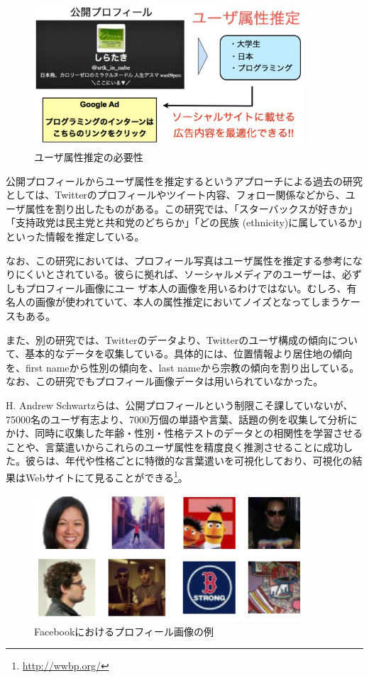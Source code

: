 \begin{figure}[tbp]
 \begin{center}
  \includegraphics[width=100mm]{img/c7/prof2prop}
 \end{center}
 \caption{ユーザ属性推定の必要性}
 \label{c7_prof2prop}
\end{figure}

公開プロフィールからユーザ属性を推定するというアプローチによる過去の研究としては、Twitterのプロフィールやツイート内容、フォロー関係などから、ユーザ属性を割り出したものがある\cite{pennacchiotti2011a-machine}。この研究では、「スターバックスが好きか」「支持政党は民主党と共和党のどちらか」「どの民族 (ethnicity)に属しているか」といった情報を推定している。\par
なお、この研究においては、プロフィール写真はユーザ属性を推定する参考になりにくいとされている。彼らに拠れば、ソーシャルメディアのユーザーは、必ずしもプロフィール画像にユー
ザ本人の画像を用いるわけではない。むしろ、有名人の画像が使われていて、本人の属性推定においてノイズとなってしまうケースもある。\par
また、別の研究\cite{mislove2011understanding}では、Twitterのデータより、Twitterのユーザ構成の傾向について、基本的なデータを収集している。具体的には、位置情報より居住地の傾向を、first nameから性別の傾向を、last nameから宗教の傾向を割り出している。なお、この研究でもプロフィール画像データは用いられていなかった。\par
H. Andrew Schwartzらは、公開プロフィールという制限こそ課していないが、75000名のユーザ有志より、7000万個の単語や言葉、話題の例を収集して分析にかけ、同時に収集した年齢・性別・性格テストのデータとの相関性を学習させることや、言葉遣いからこれらのユーザ属性を精度良く推測させることに成功した\cite{schwartz2013personality}。彼らは、年代や性格ごとに特徴的な言葉遣いを可視化しており、可視化の結果はWebサイトにて見ることができる\footnote{\url{http://wwbp.org/}}。

\begin{figure}[tbp]
 \begin{center}
  \includegraphics[width=100mm]{img/c7/pic_sample}
 \end{center}
 \caption{Facebookにおけるプロフィール画像の例}
 \label{c7_pic_sample}
\end{figure}

